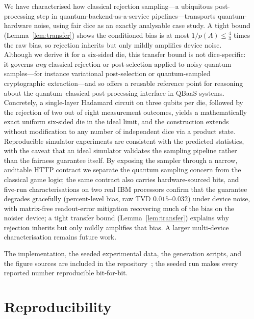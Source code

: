 \documentclass[journal]{IEEEtran}
\begin{document}
We have characterised how classical rejection sampling---a ubiquitous post-processing step in quantum-backend-as-a-service pipelines---transports quantum-hardware noise, using fair dice as an exactly analysable case study. A tight bound (Lemma~\ref{lem:transfer}) shows the conditioned bias is at most $1/p(A)\le\tfrac43$ times the raw bias, so rejection inherits but only mildly amplifies device noise. Although we derive it for a six-sided die, this transfer bound is not dice-specific: it governs \emph{any} classical rejection or post-selection applied to noisy quantum samples---for instance variational post-selection or quantum-sampled cryptographic extraction---and so offers a reusable reference point for reasoning about the quantum--classical post-processing interface in QBaaS systems. Concretely, a single-layer Hadamard circuit on three qubits per die, followed by the rejection of two out of eight measurement outcomes, yields a mathematically exact uniform six-sided die in the ideal limit, and the construction extends without modification to any number of independent dice via a product state. Reproducible simulator experiments are consistent with the predicted statistics, with the caveat that an ideal simulator validates the sampling pipeline rather than the fairness guarantee itself. By exposing the sampler through a narrow, auditable HTTP contract we separate the quantum sampling concern from the classical game logic; the same contract also carries hardware-sourced bits, and five-run characterisations on two real IBM processors confirm that the guarantee degrades gracefully (percent-level bias, raw $\mathrm{TVD}$ $0.015$--$0.032$) under device noise, with matrix-free readout-error mitigation recovering much of the bias on the noisier device; a tight transfer bound (Lemma~\ref{lem:transfer}) explains why rejection inherits but only mildly amplifies that bias. A larger multi-device characterisation remains future work.

The implementation, the seeded experimental data, the generation scripts, and the figure sources are included in the repository~\cite{projectrepo}; the seeded run makes every reported number reproducible bit-for-bit.

\section*{Reproducibility}
\end{document}
